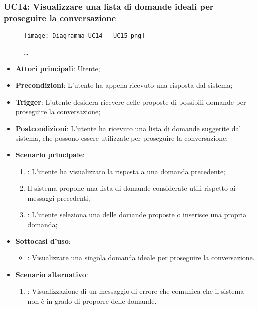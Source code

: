 \hypertarget{UC14}{}
\subsubsection{UC14: Visualizzare una lista di domande ideali per proseguire la conversazione}

\begin{figure}[h]
    \centering
    \texttt{[image: Diagramma UC14 - UC15.png]}
    \caption{\dots}
\end{figure}

\begin{itemize}
    \item \textbf{Attori principali}: Utente;
    \item \textbf{Precondizioni}: L'utente ha appena ricevuto una risposta dal sistema;
    \item \textbf{Trigger}: L'utente desidera ricevere delle proposte di possibili domande per proseguire la conversazione;
    \item \textbf{Postcondizioni}: L'utente ha ricevuto una lista di domande suggerite dal sistema, che possono essere utilizzate per proseguire la conversazione;
    \item \textbf{Scenario principale}:
    \begin{enumerate}
        \item {}: L'utente ha visualizzato la risposta a una domanda precedente;
        \item Il sistema propone una lista di domande considerate utili rispetto ai messaggi precedenti;
        \item {}: L'utente seleziona una delle domande proposte o inserisce una propria domanda;
    \end{enumerate}
    \item \textbf{Sottocasi d'uso}:
    \begin{itemize}
        \item {}: Visualizzare una singola domanda ideale per proseguire la conversazione.
    \end{itemize}
    \item \textbf{Scenario alternativo}:
    \begin{enumerate}
        \item {}: Visualizzazione di un messaggio di errore che comunica che il sistema non è in grado di proporre delle domande.
    \end{enumerate}
\end{itemize}

